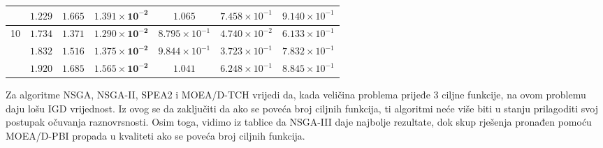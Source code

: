 \documentclass[times, utf8, zavrsni, numeric]{fer}
\begin{document}
\begin{table}[htb]
\begin{tabular}{c|c|c|c|c|c|c}
                    & $1.229$                  & $1.665$               & $\mathbf{1.391\times 10^{-2}}$ & $1.065$               & $7.458\times 10^{-1}$ & $9.140\times 10^{-1}$\\ \hline
\multirow{3}{*}{10} & $1.734$                  & $1.371$               & $\mathbf{1.290\times 10^{-2}}$ & $8.795\times 10^{-1}$ & $4.740\times 10^{-2}$ & $6.133\times 10^{-1}$\\
			        & $1.832$                  & $1.516$               & $\mathbf{1.375\times 10^{-2}}$ & $9.844\times 10^{-1}$ & $3.723\times 10^{-1}$ & $7.832\times 10^{-1}$\\
                    & $1.920$                  & $1.685$               & $\mathbf{1.565\times 10^{-2}}$ & $1.041$               & $6.248\times 10^{-1}$ & $8.845\times 10^{-1}$\\ \hline\end{tabular}
\end{table}
Za algoritme NSGA, NSGA-II, SPEA2 i MOEA/D-TCH vrijedi da, kada veličina problema prijeđe 3 ciljne funkcije, na ovom problemu daju lošu IGD vrijednost. Iz ovog se da zaključiti da ako se poveća broj ciljnih funkcija, ti algoritmi neće više biti u stanju prilagoditi svoj postupak očuvanja raznovrsnosti. Osim toga, vidimo iz tablice da NSGA-III daje najbolje rezultate, dok skup rješenja pronađen pomoću MOEA/D-PBI propada u kvaliteti ako se poveća broj ciljnih funkcija. 
\end{document}
